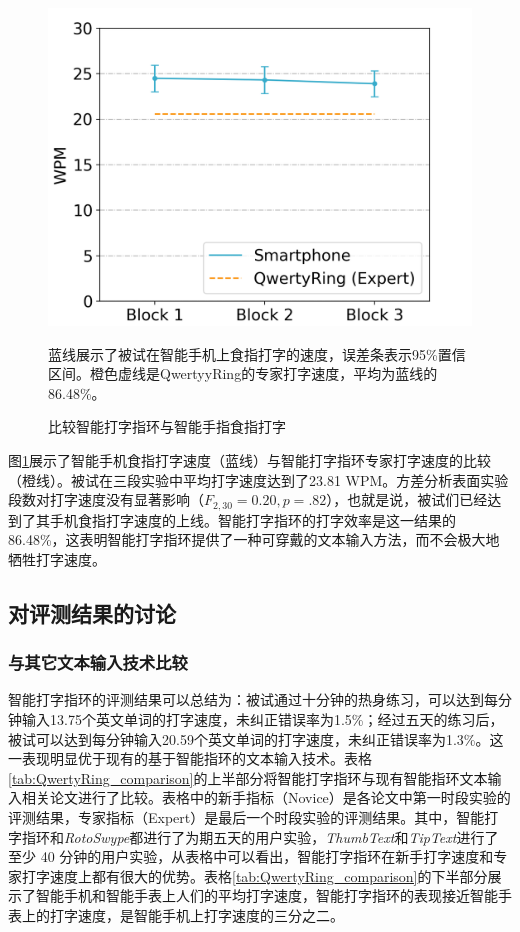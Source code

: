 \begin{figure}[!htbp]
	\centering
	\includegraphics[width=0.8\linewidth]{figures/QwertyRing_vs_smartphone.png}
	\caption*{蓝线展示了被试在智能手机上食指打字的速度，误差条表示95\%置信区间。橙色虚线是QwertyyRing的专家打字速度，平均为蓝线的86.48\%。}
	\caption{比较智能打字指环与智能手指食指打字}
	\label{fig:QwertyRing_vs_smartphone}
\end{figure}

图\ref{fig:QwertyRing_vs_smartphone}展示了智能手机食指打字速度（蓝线）与智能打字指环专家打字速度的比较（橙线）。被试在三段实验中平均打字速度达到了23.81 WPM。方差分析表面实验段数对打字速度没有显著影响（$F_{2,30}=0.20,p=.82$），也就是说，被试们已经达到了其手机食指打字速度的上线。智能打字指环的打字效率是这一结果的86.48\%，这表明智能打字指环提供了一种可穿戴的文本输入方法，而不会极大地牺牲打字速度。

\subsection{对评测结果的讨论}

\subsubsection{与其它文本输入技术比较}

智能打字指环的评测结果可以总结为：被试通过十分钟的热身练习，可以达到每分钟输入13.75个英文单词的打字速度，未纠正错误率为1.5\%；经过五天的练习后，被试可以达到每分钟输入20.59个英文单词的打字速度，未纠正错误率为1.3\%。这一表现明显优于现有的基于智能指环的文本输入技术。表格\ref{tab:QwertyRing_comparison}的上半部分将智能打字指环与现有智能指环文本输入相关论文进行了比较。表格中的新手指标（Novice）是各论文中第一时段实验的评测结果，专家指标（Expert）是最后一个时段实验的评测结果。其中，智能打字指环和\emph{RotoSwype}都进行了为期五天的用户实验，\emph{ThumbText}和\emph{TipText}进行了至少 40 分钟的用户实验，从表格中可以看出，智能打字指环在新手打字速度和专家打字速度上都有很大的优势。表格\ref{tab:QwertyRing_comparison}的下半部分展示了智能手机和智能手表上人们的平均打字速度，智能打字指环的表现接近智能手表上的打字速度，是智能手机上打字速度的三分之二。


